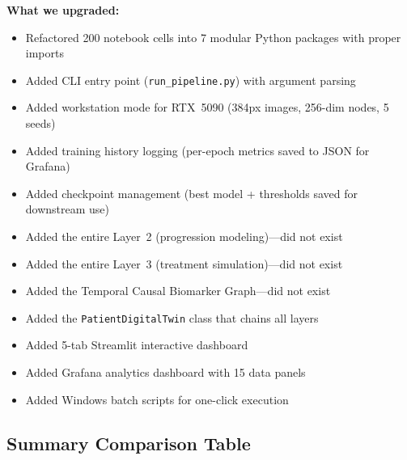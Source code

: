 \documentclass[12pt,a4paper]{article}
\begin{document}
\textbf{What we upgraded:}
\begin{itemize}[nosep]
  \item Refactored 200 notebook cells into 7 modular Python packages with proper imports
  \item Added CLI entry point (\texttt{run\_pipeline.py}) with argument parsing
  \item Added workstation mode for RTX~5090 (384px images, 256-dim nodes, 5 seeds)
  \item Added training history logging (per-epoch metrics saved to JSON for Grafana)
  \item Added checkpoint management (best model + thresholds saved for downstream use)
  \item Added the entire Layer~2 (progression modeling)---did not exist
  \item Added the entire Layer~3 (treatment simulation)---did not exist
  \item Added the Temporal Causal Biomarker Graph---did not exist
  \item Added the \texttt{PatientDigitalTwin} class that chains all layers
  \item Added 5-tab Streamlit interactive dashboard
  \item Added Grafana analytics dashboard with 15 data panels
  \item Added Windows batch scripts for one-click execution
\end{itemize}

\subsection{Summary Comparison Table}
\end{document}
